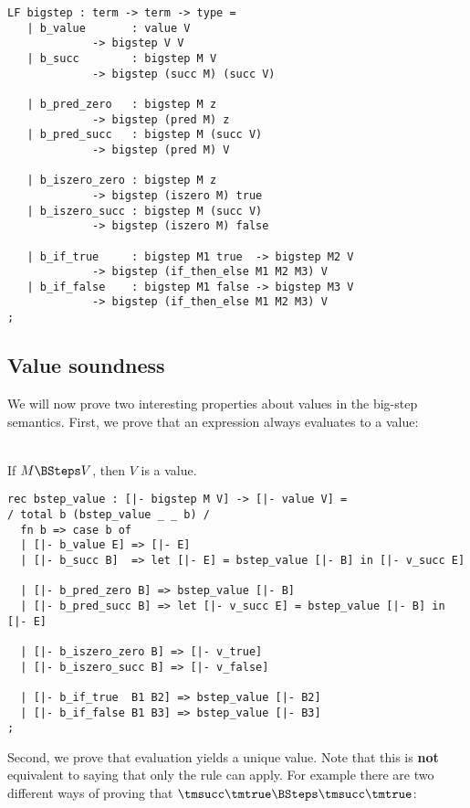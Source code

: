 \begin{lstlisting}
LF bigstep : term -> term -> type =
   | b_value       : value V
		     -> bigstep V V
   | b_succ        : bigstep M V
		     -> bigstep (succ M) (succ V)

   | b_pred_zero   : bigstep M z
		     -> bigstep (pred M) z
   | b_pred_succ   : bigstep M (succ V)
		     -> bigstep (pred M) V

   | b_iszero_zero : bigstep M z
		     -> bigstep (iszero M) true
   | b_iszero_succ : bigstep M (succ V)
		     -> bigstep (iszero M) false

   | b_if_true     : bigstep M1 true  -> bigstep M2 V
		     -> bigstep (if_then_else M1 M2 M3) V
   | b_if_false    : bigstep M1 false -> bigstep M3 V
		     -> bigstep (if_then_else M1 M2 M3) V
;
\end{lstlisting}

\subsection{Value soundness}

We will now prove two interesting properties about values in the big-step semantics.
First, we prove that an expression always evaluates to a value:

\begin{lemma}
  \label{lem:bstep-value-soundness}
  ~\\If $M \BSteps V$, then $V$ is a value.
\end{lemma}

\begin{lstlisting}
rec bstep_value : [|- bigstep M V] -> [|- value V] =
/ total b (bstep_value _ _ b) /
  fn b => case b of
  | [|- b_value E] => [|- E]
  | [|- b_succ B]  => let [|- E] = bstep_value [|- B] in [|- v_succ E]

  | [|- b_pred_zero B] => bstep_value [|- B]
  | [|- b_pred_succ B] => let [|- v_succ E] = bstep_value [|- B] in [|- E]

  | [|- b_iszero_zero B] => [|- v_true]
  | [|- b_iszero_succ B] => [|- v_false]

  | [|- b_if_true  B1 B2] => bstep_value [|- B2]
  | [|- b_if_false B1 B3] => bstep_value [|- B3]
;
\end{lstlisting}

Second, we  prove that evaluation yields a unique value. Note that
this is {\bf not} equivalent to saying that only the \BValue rule can
apply. For example there are two different ways of proving that
$\tmsucc \tmtrue \BSteps \tmsucc \tmtrue$:

